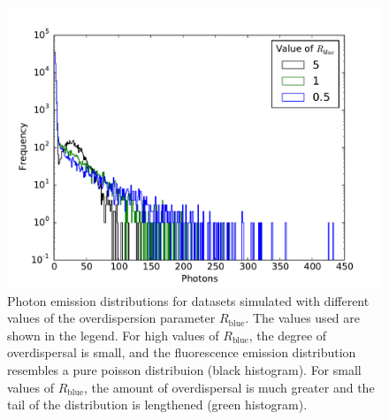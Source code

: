 \begin{figure}
   \begin{center}
      \includegraphics*[clip=true, width=6in]{sizing/varying_R_blue.pdf}
      \caption{Photon emission distributions for datasets simulated with different values of the overdispersion parameter $R_{\text{blue}}$. The values used are shown in the legend. For high values of $R_{\text{blue}}$, the degree of overdispersal is small, and the fluorescence emission distribution resembles a pure poisson distribuion (black histogram). For small values of $R_{\text{blue}}$, the amount of overdispersal is much greater and the tail of the distribution is lengthened (green histogram).} 
      \label{fig:R_blue}
   \end{center}
\end{figure}

